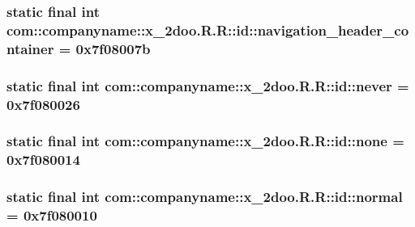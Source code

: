 \hypertarget{classcom_1_1companyname_1_1x__2doo_1_1_r_1_1id_d28ab9d644164f2e602e861c3168bf7a}{
\subsubsection[{navigation\_\-header\_\-container}]{\setlength{\rightskip}{0pt plus 5cm}static final int com::companyname::x\_\-2doo.R.R::id::navigation\_\-header\_\-container = 0x7f08007b}}
\label{classcom_1_1companyname_1_1x__2doo_1_1_r_1_1id_d28ab9d644164f2e602e861c3168bf7a}


\hypertarget{classcom_1_1companyname_1_1x__2doo_1_1_r_1_1id_a15640b6cbf178933b41eb8f266b2858}{
\subsubsection[{never}]{\setlength{\rightskip}{0pt plus 5cm}static final int com::companyname::x\_\-2doo.R.R::id::never = 0x7f080026}}
\label{classcom_1_1companyname_1_1x__2doo_1_1_r_1_1id_a15640b6cbf178933b41eb8f266b2858}


\hypertarget{classcom_1_1companyname_1_1x__2doo_1_1_r_1_1id_5b16b6b29a9dd16c064afbffcac0a406}{
\subsubsection[{none}]{\setlength{\rightskip}{0pt plus 5cm}static final int com::companyname::x\_\-2doo.R.R::id::none = 0x7f080014}}
\label{classcom_1_1companyname_1_1x__2doo_1_1_r_1_1id_5b16b6b29a9dd16c064afbffcac0a406}


\hypertarget{classcom_1_1companyname_1_1x__2doo_1_1_r_1_1id_13b5fcdc9680286a59ef6b5ca9d7be34}{
\subsubsection[{normal}]{\setlength{\rightskip}{0pt plus 5cm}static final int com::companyname::x\_\-2doo.R.R::id::normal = 0x7f080010}}
\label{classcom_1_1companyname_1_1x__2doo_1_1_r_1_1id_13b5fcdc9680286a59ef6b5ca9d7be34}


